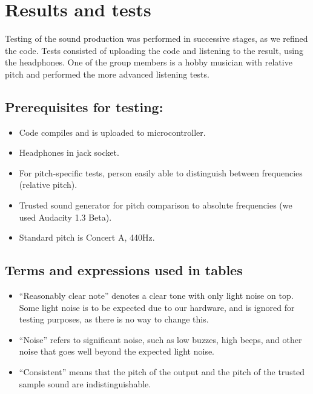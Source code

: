 \section{Results and tests}

Testing of the sound production was performed in successive stages, as
we refined the code. Tests consisted of uploading the code and listening
to the result, using the headphones. One of the group members is a hobby
musician with relative pitch and performed the more advanced listening
tests.

\subsection{Prerequisites for testing:}
\begin{itemize}
\item Code compiles and is uploaded to microcontroller.
\item Headphones in jack socket.
\item For pitch-specific tests, person easily able to distinguish between frequencies (relative pitch).
\item Trusted sound generator for pitch comparison to absolute frequencies (we used Audacity 1.3 Beta).
\item Standard pitch is Concert A, 440Hz.
\end{itemize}

\subsection{Terms and expressions used in tables}
\begin{itemize}
\item ``Reasonably clear note'' denotes a clear tone with only light
noise on top. Some light noise is to be expected due to our hardware,
and is ignored for testing purposes, as there is no way to change this.
\item ``Noise'' refers to significant noise, such as low buzzes, high
beeps, and other noise that goes well beyond the expected light noise.
\item ``Consistent'' means that the pitch of the output and the
pitch of the trusted sample sound are indistinguishable.
\end{itemize}

